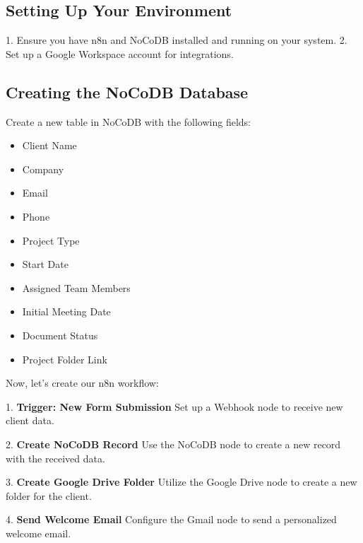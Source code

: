 \subsection{Setting Up Your Environment}

1. Ensure you have n8n and NoCoDB installed and running on your system.
2. Set up a Google Workspace account for integrations.

\subsection{Creating the NoCoDB Database}

Create a new table in NoCoDB with the following fields:
\begin{itemize}
    \item Client Name
    \item Company
    \item Email
    \item Phone
    \item Project Type
    \item Start Date
    \item Assigned Team Members
    \item Initial Meeting Date
    \item Document Status
    \item Project Folder Link
\end{itemize}

Now, let's create our n8n workflow:

1. \textbf{Trigger: New Form Submission}
Set up a Webhook node to receive new client data.


2. \textbf{Create NoCoDB Record}
Use the NoCoDB node to create a new record with the received data.


3. \textbf{Create Google Drive Folder}
Utilize the Google Drive node to create a new folder for the client.


4. \textbf{Send Welcome Email}
Configure the Gmail node to send a personalized welcome email.


